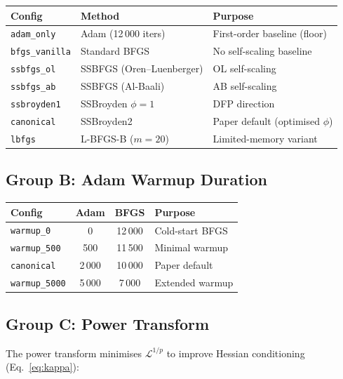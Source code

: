 \documentclass[11pt,a4paper]{article}
\begin{document}
\begin{center}
\begin{tabular}{@{}llp{6.5cm}@{}}
\toprule
\textbf{Config} & \textbf{Method} & \textbf{Purpose} \\
\midrule
\texttt{adam\_only}     & Adam (12\,000 iters) & First-order baseline (floor) \\
\texttt{bfgs\_vanilla}  & Standard BFGS       & No self-scaling baseline \\
\texttt{ssbfgs\_ol}     & SSBFGS (Oren--Luenberger) & OL self-scaling \\
\texttt{ssbfgs\_ab}     & SSBFGS (Al-Baali)    & AB self-scaling \\
\texttt{ssbroyden1}     & SSBroyden $\phi{=}1$ & DFP direction \\
\texttt{canonical}       & SSBroyden2           & Paper default (optimised $\phi$) \\
\texttt{lbfgs}           & L-BFGS-B ($m{=}20$)  & Limited-memory variant \\
\bottomrule
\end{tabular}
\end{center}

\subsection{Group B: Adam Warmup Duration}

\begin{center}
\begin{tabular}{@{}lccp{5cm}@{}}
\toprule
\textbf{Config} & \textbf{Adam} & \textbf{BFGS} & \textbf{Purpose} \\
\midrule
\texttt{warmup\_0}    & 0       & 12\,000 & Cold-start BFGS \\
\texttt{warmup\_500}  & 500     & 11\,500 & Minimal warmup \\
\texttt{canonical}     & 2\,000  & 10\,000 & Paper default \\
\texttt{warmup\_5000} & 5\,000  & 7\,000  & Extended warmup \\
\bottomrule
\end{tabular}
\end{center}

\subsection{Group C: Power Transform}

The power transform minimises $\mathcal{L}^{1/p}$ to improve
Hessian conditioning (Eq.~\eqref{eq:kappa}):
\end{document}
